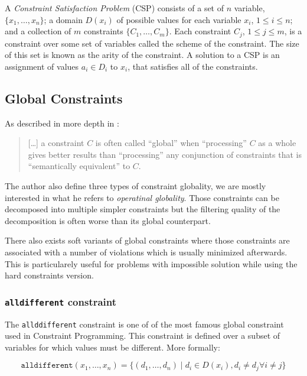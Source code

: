 \documentclass[../../thesis.tex]{subfiles}
\begin{document}
A \emph{Constraint Satisfaction Problem} (CSP) consists of a set of $n$ variable, 
$\{x_1, \dots, x_n \}$; a domain $D(x_i)$ of possible values for each variable $x_i$, 
$1 \leq i \leq n$; and a collection of $m$ constraints $\{ C_1, \dots, C_m \}$. 
Each constraint $C_j$, $1 \leq j \leq m$, is a constraint over some set of variables called the scheme 
of the constraint. The size of this set is known as the arity of the constraint. 
A solution to a CSP is an assignment of values $a_i \in D_i$ to $x_i$, that satisfies all of the constraints. \cite{cp-definition}

\subsection{Global Constraints}

As described in more depth in \cite{Hentenryck:2003}:

\begin{quotation}
  [\dots] a constraint $C$ is often called “global” when “processing” $C$ as a whole gives better results than “processing” any conjunction
  of constraints that is “semantically equivalent” to $C$.
\end{quotation}

The author also define three types of constraint globality, we are mostly interested in what he refers to \emph{operatinal globality}. 
Those constraints can be decomposed into multiple simpler constraints but the filtering quality of the decomposition
is often worse than its global counterpart. 

There also exists soft variants of global constraints where those constraints are associated with 
a number of violations which is usually minimized afterwards. This is particularely useful for problems with impossible 
solution while using the hard constraints version.

\subsubsection{\texttt{alldifferent} constraint}

The \texttt{allddifferent} constraint \cite{Rgin1994AFA} is one of of the most famous global constraint used in Constraint 
Programming.
This constraint is defined over a subset of variables for which values must be different. More formally:

\begin{equation*}
  \texttt{alldifferent}(x_1, \dots, x_n) = \{ (d_1, \dots, d_n) \mid d_i \in D(x_i), d_i \neq d_j \forall i \neq j \}
\end{equation*}
\end{document}
